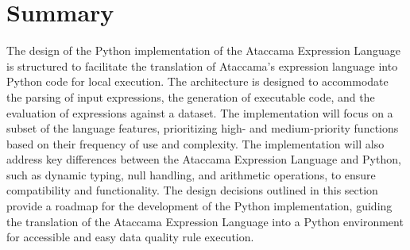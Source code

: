 \section{Summary}

The design of the Python implementation of the Ataccama Expression Language is structured to facilitate the translation of Ataccama's expression language into Python code for local execution. The architecture is designed to accommodate the parsing of input expressions, the generation of executable code, and the evaluation of expressions against a dataset. The implementation will focus on a subset of the language features, prioritizing high- and medium-priority functions based on their frequency of use and complexity. The implementation will also address key differences between the Ataccama Expression Language and Python, such as dynamic typing, null handling, and arithmetic operations, to ensure compatibility and functionality. The design decisions outlined in this section provide a roadmap for the development of the Python implementation, guiding the translation of the Ataccama Expression Language into a Python environment for accessible and easy data quality rule execution.